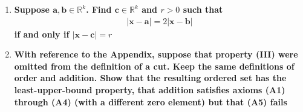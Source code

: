 \documentclass[Main.tex]{subfiles}
\begin{document}
\begin{enumerate}
        
    
    \item \textbf{Suppose $\boldsymbol{a,b}\in\mathbb{R}^k$. Find $\boldsymbol{c}\in\mathbb{R}^k$ and $r>0$ such that}
    \begin{align*}
        \lvert\boldsymbol{x-a}\rvert = 2\lvert\boldsymbol{x-b}\rvert
    \end{align*}
    \textbf{if and only if $\lvert\boldsymbol{x-c}\rvert = r$}
    
        
    
    \item \textbf{With reference to the Appendix, suppose that property (III) were omitted from the definition of a cut. Keep the same definitions of order and addition. Show that the resulting ordered set has the least-upper-bound property, that addition satisfies axioms (A1) through (A4) (with a different zero element) but that (A5) fails}
    
        
    
\end{enumerate}
\end{document}
